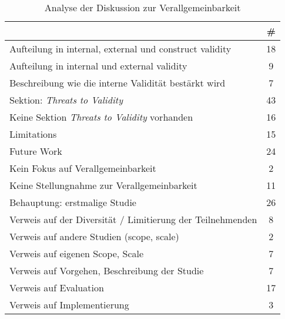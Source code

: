 \begin{table}[h!]
    \begin{tabular}{ l | c }
        & \# \\
        \hline
        Aufteilung in internal, external und construct validity & 18 \\
        Aufteilung in internal und external validity & 9 \\
        Beschreibung wie die interne Validität bestärkt wird & 7 \\
        \hline
        Sektion: \textit{Threats to Validity} & 43 \\
        Keine Sektion \textit{Threats to Validity} vorhanden & 16 \\
        \hline
        Limitations & 15 \\
        Future Work & 24 \\
        \hline
        Kein Fokus auf Verallgemeinbarkeit & 2 \\
        Keine Stellungnahme zur Verallgemeinbarkeit & 11 \\
        Behauptung: erstmalige Studie & 26 \\
        \hline
        Verweis auf der Diversität / Limitierung der Teilnehmenden & 8 \\
        Verweis auf andere Studien (scope, scale) & 2 \\
        Verweis auf eigenen Scope, Scale & 7 \\
        Verweis auf Vorgehen, Beschreibung der Studie & 7 \\
        Verweis auf Evaluation & 17 \\
        Verweis auf Implementierung & 3 \\
    \end{tabular}
    \caption{Analyse der Diskussion zur Verallgemeinbarkeit}
    \label{table:threats-of-validity}
\end{table}


